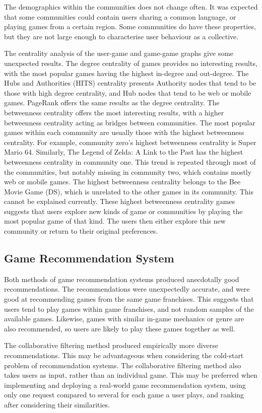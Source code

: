 The demographics within the communities does not change often. It was expected that some communities could contain users sharing a common language, or playing games from a certain region. Some communities do have these properties, but they are not large enough to characterise user behaviour as a collective.


The centrality analysis of the user-game and game-game graphs give some unexpected results. The degree centrality of games provides no interesting results, with the most popular games having the highest in-degree and out-degree. The Hubs and Authorities (HITS) centrality presents Authority nodes that tend to be those with high degree centrality, and Hub nodes that tend to be web or mobile games. PageRank offers the same results as the degree centrality. The betweenness centrality offers the most interesting results, with a higher betweenness centrality acting as bridges between communities. The most popular games within each community are usually those with the highest betweenness centrality. For example, community zero's highest betweenness centrality is Super Mario 64. Similarly, The Legend of Zelda: A Link to the Past has the highest betweenness centrality in community one. This trend is repeated through most of the communities, but notably missing in community two, which contains mostly web or mobile games. The highest betweenness centrality belongs to the Bee Movie Game (DS), which is unrelated to the other games in its community. This cannot be explained currently. These highest betweenness centrality games suggests that users explore new kinds of game or communities by playing the most popular game of that kind. The users then either explore this new community or return to their original preferences.

\subsection{Game Recommendation System}

Both methods of game recommendation systems produced anecdotally good recommendations. The recommendations were unexpectedly accurate, and were good at recommending games from the same game franchises. This suggests that users tend to play games within game franchises, and not random samples of the available games. Likewise, games with similar in-game mechanics or genre are also recommended, so users are likely to play these games together as well. 


The collaborative filtering method produced empirically more diverse recommendations. This may be advantageous when considering the cold-start problem of recommendation systems. The collaborative filtering method also takes users as input, rather than an individual game. This may be preferred when implementing and deploying a real-world game recommendation system, using only one request compared to several for each game a user plays, and ranking after considering their similarities.

